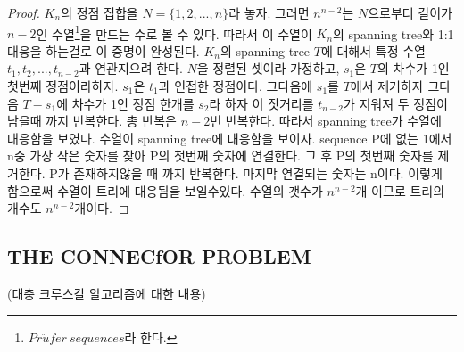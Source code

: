 \begin{proof}
    $K_n$의 정점 집합을 $N = \{1,2, ...,n\}$라 놓자.
    그러면 $n^{n-2}$는  $N$으로부터 길이가 $n-2$인 수열\footnote{$Pr\ddot{u}fer \: sequences$라 한다.}을 만드는 수로 볼 수 있다.
    따라서 이 수열이 $K_n$의 spanning tree와 1:1대응을 하는걸로 이 증명이 완성된다.
    $K_n$의 spanning tree $T$에 대해서 특정 수열 ${t_1, t_2, ... , t_{n-2}}$과 연관지으려 한다.
    $N$을 정렬된 셋이라 가정하고, $s_1$은 $T$의 차수가 1인 첫번째 정점이라하자. $s_1$은 $t_1$과 인접한 정점이다.
    그다음에 $s_1$를 $T$에서 제거하자 그다음 $T-s_1$에 차수가 1인 정점 한개를 $s_2$라 하자 이 짓거리를 $t_{n-2}$가 지워져 두 정점이 남을때 까지 반복한다. 총 반복은 $n-2$번 반복한다. 따라서 spanning tree가 수열에 대응함을 보였다.
    수열이 spanning tree에 대응함을 보이자.
    sequence P에 없는 1에서 n중 가장 작은 숫자를 찾아 P의 첫번째 숫자에 연결한다.
    그 후 P의 첫번째 숫자를 제거한다.
    P가 존재하지않을 때 까지 반복한다. 마지막 연결되는 숫자는 n이다.
    이렇게 함으로써 수열이 트리에 대응됨을 보일수있다.
    수열의 갯수가 $n^{n-2}$개 이므로 트리의 개수도 $n^{n-2}$개이다.
\end{proof}

\subsection{THE CONNECfOR PROBLEM}
(대충 크루스칼 알고리즘에 대한 내용)